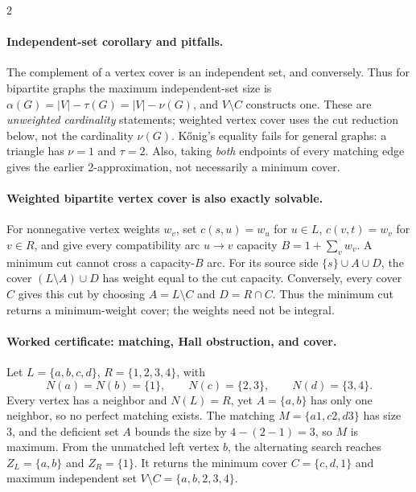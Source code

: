 \documentclass[10pt]{article}
\theoremstyle{definition}
\begin{document}
\begin{multicols*}{2}
\paragraph{Independent-set corollary and pitfalls.}
The complement of a vertex cover is an independent set, and conversely.
Thus for bipartite graphs the maximum independent-set size is
$\alpha(G)=|V|-\tau(G)=|V|-\nu(G)$, and $V\setminus C$ constructs one.
These are \emph{unweighted cardinality} statements; weighted vertex cover
uses the cut reduction below, not the cardinality $\nu(G)$.
K\H{o}nig's equality fails for general graphs: a triangle has $\nu=1$ and
$\tau=2$. Also, taking \emph{both} endpoints of every matching edge gives
the earlier 2-approximation, not necessarily a minimum cover.

\begin{samepage}
\paragraph{Weighted bipartite vertex cover is also exactly solvable.}
For nonnegative vertex weights $w_v$, set $c(s,u)=w_u$ for $u\in L$,
$c(v,t)=w_v$ for $v\in R$, and give every compatibility arc $u\to v$
capacity $B=1+\sum_v w_v$. A minimum cut cannot cross a capacity-$B$ arc.
For its source side $\{s\}\cup A\cup D$, the cover
$(L\setminus A)\cup D$ has weight equal to the cut capacity.
Conversely, every cover $C$ gives this cut by choosing $A=L\setminus C$
and $D=R\cap C$. Thus the minimum cut returns a minimum-weight cover;
the weights need not be integral.\par
\end{samepage}

\paragraph{Worked certificate: matching, Hall obstruction, and cover.}
Let $L=\{a,b,c,d\}$, $R=\{1,2,3,4\}$, with
\[
 N(a)=N(b)=\{1\},\qquad N(c)=\{2,3\},\qquad N(d)=\{3,4\}.
\]
Every vertex has a neighbor and $N(L)=R$, yet $A=\{a,b\}$ has only one
neighbor, so no perfect matching exists. The matching
$M=\{a1,c2,d3\}$ has size 3, and the deficient set $A$ bounds the size
by $4-(2-1)=3$, so $M$ is maximum. From the unmatched left vertex $b$,
the alternating search reaches $Z_L=\{a,b\}$ and $Z_R=\{1\}$. It returns
the minimum cover $C=\{c,d,1\}$ and maximum independent set
$V\setminus C=\{a,b,2,3,4\}$.


\end{multicols*}
\end{document}

